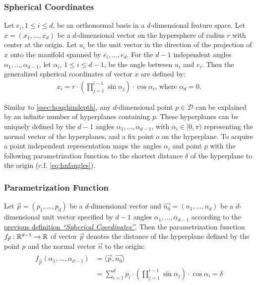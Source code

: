 \subsubsection*{Spherical Coordinates}\label{def:spherecord}
Let $e_i, 1 \leq i \leq d$, be an orthonormal basis in a $d$-dimensional feature space. Let $x=(x_1,\dotsc,x_d)$ be a $d$-dimensional vector on the hypersphere of radius $r$ with center at the origin. Let $u_i$ be the unit vector in the direction of the projection of $x$ onto the manifold spanned by $e_i,\dotsc,e_d$. For the $d-1$ independent angles $\alpha_1,\dotsc,\alpha_{d-1}$, let $\alpha_i$, $1 \leq i \leq d-1$, be the angle between $u_i$ and $e_i$. Then the generalized spherical coordinates of vector $x$ are defined by:
\begin{align}
    x_i = r \cdot (\prod_{j=1}^{i-1}\sin{\alpha_j}) \cdot \cos{\alpha_i}\text{, where } \alpha_d = 0.
\end{align}

Similar to \autoref{ssec:houghindepth}, any $d$-dimensional point $p \in \mathcal{D}$ can be explained by an infinite number of hyperplanes containing $p$. These hyperplanes can be uniquely defined by the $d-1$ angles $\alpha_1,\dotsc,\alpha_{d-1}$, with $\alpha_i \in [0,\pi)$ representing the normal vector of the hyperplanes, and a fix point $o$ on the hyperplane. To acquire a point independent representation \textcite{CASHachtert2008robust} maps the angles $\alpha_i$ and point $p$ with the following parametrization function to the shortest distance $\delta$ of the hyperplane to the origin (c.f. \ref{eq:hnfangles}).

\subsubsection*{Parametrization Function}
Let $\vec{p} = (p_1,\dotsc,p_d)$ be a $d$-dimensional vector and $\vec{n_0} = (n_1,\dotsc,n_d)$ be a $d$-dimensional unit vector specified by $d-1$ angles $\alpha_1,\dotsc,\alpha_{d-1}$ according to the \hyperref[def:spherecord]{previous definition \textit{``Spherical Coordinates''}}. Then the parametrization function $f_{\vec{p}}:\mathbb{R}^{d-1} \rightarrow \mathbb{R}$ of vector $\vec{p}$ denotes the distance of the hyperplane defined by the point $p$ and the normal vector $\vec{n}$ to the origin:
\begin{align}
    \begin{split}
            f_{\vec{p}}(\alpha_1,\dotsc,\alpha_{d-1}) &= \langle \vec{p},\vec{n_0} \rangle\\
    &= \sum_{i=1}^d p_i \cdot (\prod_{j=1}^{i-1} \sin{\alpha_j}) \cdot \cos{\alpha_i}  = \delta
    \end{split}
\end{align}

